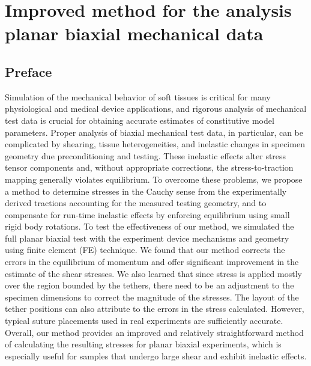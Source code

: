 \chapter{Improved method for the analysis planar biaxial mechanical data}

\section*{Preface}
%

Simulation of the mechanical behavior of soft tissues is critical for many physiological and medical device applications, and rigorous analysis of mechanical test data is crucial for obtaining accurate estimates of constitutive model parameters. Proper analysis of biaxial mechanical test data, in particular, can be complicated by shearing, tissue heterogeneities, and  inelastic changes in specimen geometry due preconditioning and testing. These inelastic effects alter stress tensor components and, without appropriate corrections, the stress-to-traction mapping generally violates equilibrium. To overcome these problems, we propose a method to determine stresses in the Cauchy sense from the experimentally derived tractions accounting for the measured testing geometry, and to compensate for run-time inelastic effects by enforcing equilibrium using small rigid body rotations. To test the effectiveness of our method, we simulated the full planar biaxial test with the experiment device mechanisms and geometry using finite element (FE) technique. We found that our method corrects the errors in the equilibrium of momentum and offer significant improvement in the estimate of the shear stresses. We also learned that since stress is applied mostly over the region bounded by the tethers, there need to be an adjustment to the specimen dimensions to correct the magnitude of the stresses. The layout of the tether positions can also attribute to the errors in the stress calculated. However, typical suture placements used in real experiments are sufficiently accurate. Overall, our method provides an improved and relatively straightforward method of calculating the resulting stresses for planar biaxial experiments, which is especially useful for samples that undergo large shear and exhibit inelastic effects. 

















